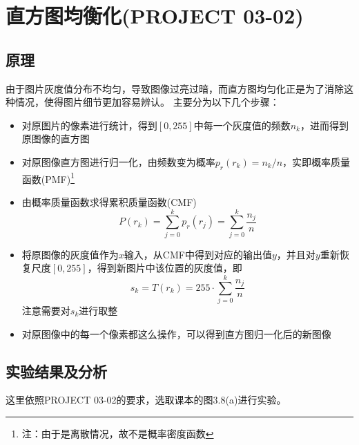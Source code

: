 \documentclass[logo,reportComp]{thesis}
\begin{document}
\section{直方图均衡化(PROJECT 03-02)}
\subsection{原理}
由于图片灰度值分布不均匀，导致图像过亮过暗，而直方图均匀化正是为了消除这种情况，使得图片细节更加容易辨认。
主要分为以下几个步骤：
\begin{itemize}
	\item 对原图片的像素进行统计，得到$[0,255]$中每一个灰度值的频数$n_k$，进而得到原图像的直方图
	\item 对原图像直方图进行归一化，由频数变为概率$p_r(r_k)=n_k/n$，实即概率质量函数(PMF)\footnote{注：由于是离散情况，故不是概率密度函数}
	\item 由概率质量函数求得累积质量函数(CMF)
	\[P(r_k)=\sum_{j=0}^kp_r(r_j)=\sum_{j=0}^k\frac{n_j}{n}\]
	\item 将原图像的灰度值作为$x$输入，从CMF中得到对应的输出值$y$，并且对$y$重新恢复尺度$[0,255]$，得到新图片中该位置的灰度值，即
	\[s_k=T(r_k)=255\cdot\sum_{j=0}^k\frac{n_j}{n}\]
	注意需要对$s_k$进行取整
	\item 对原图像中的每一个像素都这么操作，可以得到直方图归一化后的新图像
\end{itemize}

\subsection{实验结果及分析}
这里依照PROJECT 03-02的要求，选取课本的图3.8(a)进行实验。
\end{document}
